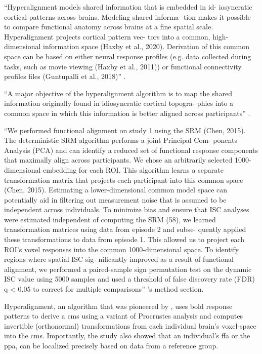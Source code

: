 ``Hyperalignment models shared information that is embedded in id- iosyncratic
cortical patterns across brains. Modeling shared informa- tion makes it possible
to compare functional anatomy across brains at a ﬁne spatial scale.
Hyperalignment projects cortical pattern vec- tors into a common,
high-dimensional information space (Haxby et al., 2020). Derivation of this
common space can be based on either neural response proﬁles (e.g. data collected
during tasks, such as movie viewing (Haxby et al., 2011)) or functional
connectivity profiles ﬁles (Guntupalli et al., 2018)'' \citep{busch2021hybrid}.

``A major objective of the hyperalignment algorithm is to map the shared
information originally found in idiosyncratic cortical topogra- phies into a
common space in which this information is better aligned across participants''
\citep{busch2021hybrid}.

``We performed functional alignment on study 1 using the SRM (Chen, 2015). The
deterministic SRM algorithm performs a joint Principal Com- ponents Analysis
(PCA) and can identify a reduced set of functional response components that
maximally align across participants. We chose an arbitrarily selected
1000-dimensional embedding for each ROI. This algorithm learns a separate
transformation matrix that projects each participant into this common space
(Chen, 2015). Estimating a lower-dimensional common model space can potentially
aid in filtering out measurement noise that is assumed to be independent across
individuals. To minimize bias and ensure that ISC analyses were estimated
independent of computing the SRM (58), we learned transformation matrices using
data from episode 2 and subse- quently applied these transformations to data
from episode 1. This allowed us to project each ROI’s voxel responses into the
common 1000-­dimensional space. To identify regions where spatial ISC sig-
nificantly improved as a result of functional alignment, we performed a
paired-sample sign permutation test on the dynamic ISC value using 5000 samples
and used a threshold of false discovery rate (FDR) q < 0.05 to correct for
multiple comparisons'' \citep{chang2021endogenous}'s method section.


%
Hyperalignment, an algorithm that was pioneered by \citet{haxby2011common}, uses
\ac{bold} response patterns to derive a \ac{cms} using a variant of Procrustes
analysis and computes invertible (orthonormal) transformations from each
individual brain's voxel-space into the \ac{cms}.
%
Importantly, the study also showed that an individual's \ac{ffa} or the
\ac{ppa}, can be localized precisely based on data from a reference group.


